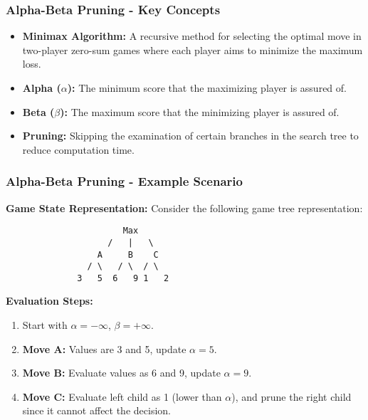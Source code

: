 \documentclass[aspectratio=169]{beamer}
\begin{document}
\begin{frame}[fragile]
    \frametitle{Alpha-Beta Pruning - Key Concepts}
    \begin{itemize}
        \item \textbf{Minimax Algorithm:} A recursive method for selecting the optimal move in two-player zero-sum games where each player aims to minimize the maximum loss.
        \item \textbf{Alpha ($\alpha$):} The minimum score that the maximizing player is assured of.
        \item \textbf{Beta ($\beta$):} The maximum score that the minimizing player is assured of.
        \item \textbf{Pruning:} Skipping the examination of certain branches in the search tree to reduce computation time.
    \end{itemize}
\end{frame}

\begin{frame}[fragile]
    \frametitle{Alpha-Beta Pruning - Example Scenario}
    \textbf{Game State Representation:}
    Consider the following game tree representation:
    \begin{center}
    \begin{verbatim}
                       Max
                    /   |   \
                  A     B    C
                / \   / \  / \
              3   5  6   9 1   2
    \end{verbatim}
    \end{center}

    \textbf{Evaluation Steps:}
    \begin{enumerate}
        \item Start with $\alpha = -\infty$, $\beta = +\infty$.
        \item \textbf{Move A:} Values are 3 and 5, update $\alpha = 5$.
        \item \textbf{Move B:} Evaluate values as 6 and 9, update $\alpha = 9$.
        \item \textbf{Move C:} Evaluate left child as 1 (lower than $\alpha$), and prune the right child since it cannot affect the decision.
    \end{enumerate}
\end{frame}
\end{document}
